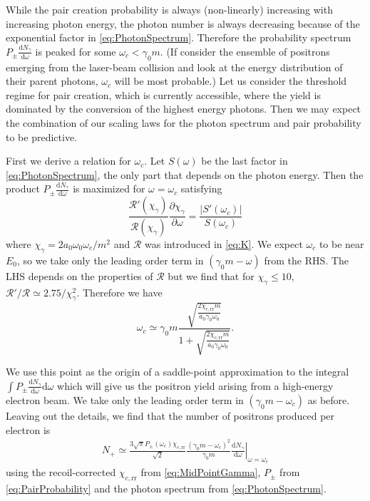 \documentclass[reprint,superscriptaddress,amsmath,amssymb,aps,pra]{revtex4-1}
\newcommand{\rmd}{\mathrm{d}}
\newcommand{\abs}[1]{\left|#1\right|}
\newcommand{\aux}{\mathcal{R}}
\newcommand{\chicrr}{\chi_{c,\mathrm{rr}}}
\begin{document}
While the pair creation probability is always (non-linearly) increasing with increasing
photon energy, the photon number is always decreasing because of the
exponential factor in \cref{eq:PhotonSpectrum}. Therefore the probability
spectrum $P_\pm \tfrac{\rmd N_\gamma}{\rmd \omega}$ is peaked
for some $\omega_c < \gamma_0 m$. (If consider the ensemble of positrons emerging from
the laser-beam collision and look at the energy distribution of their parent
photons, $\omega_c$ will be most probable.) Let us consider the threshold regime
for pair creation, which is currently accessible, where the yield is dominated
by the conversion of the highest energy photons. Then we may expect the combination
of our scaling laws for the photon spectrum and pair probability to be predictive.

First we derive a relation for $\omega_c$. Let $S(\omega)$ be the last factor in
\cref{eq:PhotonSpectrum}, the only part that depends on the photon energy.
Then the product $P_\pm \tfrac{\rmd N_\gamma}{\rmd \omega}$ is maximized for
$\omega = \omega_c$ satisfying
	\begin{equation}
	\frac{\aux'(\chi_\gamma)}{\aux(\chi_\gamma)}
	\frac{\partial \chi_\gamma}{\partial \omega}
	 = \frac{\abs{S'(\omega_c)}}{S(\omega_c)}
	\end{equation}
where $\chi_\gamma = 2 a_0 \omega_0 \omega_c / m^2$ and $\aux$ was introduced in
\cref{eq:K}. We expect $\omega_c$ to be near $E_0$, so we take only the leading
order term in $(\gamma_0 m - \omega)$ from the RHS. The LHS depends on the
properties of $\aux$ but we find that for
$\chi_\gamma \leq 10$, $\aux'/\aux \simeq 2.75/\chi_\gamma^2$.
Therefore we have
	\begin{equation}
	\omega_c \simeq
		\gamma_0 m
		\frac{\sqrt{\frac{2 \chicrr m}{a_0 \gamma_0 \omega_0}}}
		{1 + \sqrt{\frac{2 \chicrr m}{a_0 \gamma_0 \omega_0}}}.
	\label{eq:OmegaC}
	\end{equation}

We use this point as the origin of a saddle-point approximation to the integral
$\int P_\pm \tfrac{\rmd N_\gamma}{\rmd \omega} \rmd\omega$ which will give us
the positron yield arising from a high-energy electron beam.
We take only the leading order term in $(\gamma_0 m - \omega_c)$ as before.
Leaving out the details, we find that the number of positrons produced per electron is
	\begin{multline}
	N_+ \simeq
		\frac{3 \sqrt{\pi} P_\pm (\omega_c) \chicrr }{\sqrt{2}}
		\frac{(\gamma_0 m - \omega_c)^2}{\gamma_0 m}
		\left. \frac{\rmd N_\gamma}{\rmd \omega} \right|_{\omega = \omega_c}
	\label{eq:PositronYieldE}
	\end{multline}
using the recoil-corrected $\chicrr$ from \cref{eq:MidPointGamma},
$P_\pm$ from \cref{eq:PairProbability} and the photon spectrum
from \cref{eq:PhotonSpectrum}.
\end{document}
